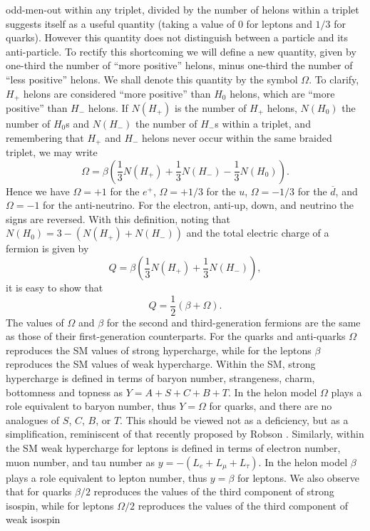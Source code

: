 \documentclass[twocolumn,showpacs,preprintnumbers,amsmath,amssymb]{revtex4}
\newcommand{\beq}{\begin{equation}}
\newcommand{\eeq}{\end{equation}}
\newcommand{\anti}[1]{\overline{#1}}
\begin{document}
odd-men-out within any triplet, divided by the number of helons within a triplet 
suggests itself as a useful quantity (taking a value of $0$ for leptons and $1/3$ 
for quarks). However this quantity does not distinguish between a particle and its 
anti-particle. To rectify this shortcoming we will define a new quantity, given 
by one-third the number of ``more positive'' helons, minus one-third the number 
of ``less positive'' helons. We shall denote this quantity by the symbol $\Omega$. 
To clarify, $H_+$ helons are considered ``more positive'' than $H_0$ helons, which 
are ``more positive'' than $H_-$ helons. If $N(H_+)$ is the number of $H_+$ 
helons, $N(H_0)$ the number of $H_0$s and $N(H_-)$ the number of $H_-$s within a 
triplet, and remembering that $H_+$ and $H_-$ helons never occur within 
the same braided triplet, we may write
\beq
\Omega=\beta\left(\frac{1}{3}N(H_+)+\frac{1}{3}N(H_-)-\frac{1}{3}N(H_0)\right).
\label{eq:Omega}
\eeq
Hence we have $\Omega=+1$ for the $e^+$, $\Omega=+1/3$ for the $u$, $\Omega=-1/3$ 
for the $\anti{d}$, and $\Omega=-1$ for the anti-neutrino. For the electron, 
anti-up, down, and neutrino the signs are reversed. With this definition,  
noting that $N(H_0)=3-(N(H_+)+N(H_-))$ and the total electric charge of a fermion 
is given by 
\beq
Q = \beta\left(\frac{1}{3}N(H_+)+\frac{1}{3}N(H_-)\right),
\eeq  
it is easy to show that 
\beq
Q = \frac{1}{2}\left(\beta + \Omega\right).
\label{eq:QbetaOmega}
\eeq
The values of $\Omega$ and $\beta$ for the second and third-generation fermions 
are the same as those of their first-generation counterparts. For the quarks and 
anti-quarks $\Omega$ reproduces the SM values of strong hypercharge, while for 
the leptons $\beta$ reproduces the SM values of weak hypercharge. Within the SM, 
strong hypercharge is defined in terms of baryon number, strangeness, charm, 
bottomness and topness as $Y=A+S+C+B+T$. In the helon model $\Omega$ plays a role 
equivalent to baryon number, thus $Y = \Omega$ for quarks, and there are no 
analogues of $S$, $C$, $B$, or $T$. This should be viewed not as a deficiency, 
but as a simplification, reminiscent of that recently proposed by Robson 
\cite{Robson}. Similarly, within the SM weak hypercharge for leptons is defined 
in terms of electron number, muon number, and tau number as 
$y = -(L_e + L_\mu + L_\tau)$. In the helon model $\beta$ plays a role equivalent
to lepton number, thus $y = \beta$ for leptons. We also observe that for quarks 
$\beta/2$ reproduces the values of the third component of strong isospin, while 
for leptons $\Omega/2$ reproduces the values of the third component of weak isospin 
\end{document}
